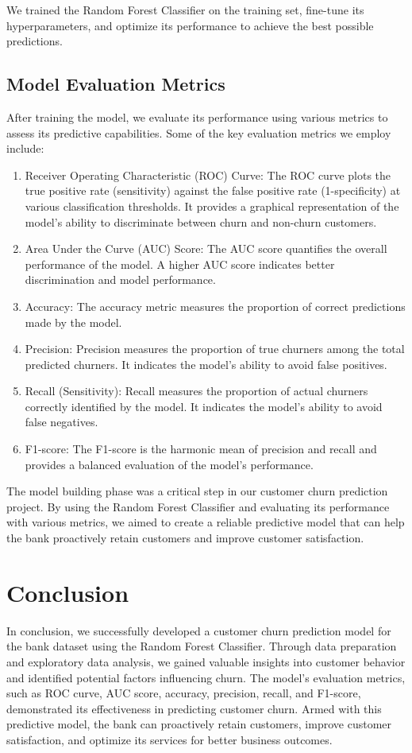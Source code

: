 \documentclass[11pt,a4paper]{article}
\begin{document}
We trained the Random Forest Classifier on the training set, fine-tune its hyperparameters, and optimize its performance to achieve the best possible predictions.

\subsection{Model Evaluation Metrics}

After training the model, we evaluate its performance using various metrics to assess its predictive capabilities. Some of the key evaluation metrics we employ include: 

\begin{enumerate}
    \item Receiver Operating Characteristic (ROC) Curve: The ROC curve plots the true positive rate (sensitivity) against the false positive rate (1-specificity) at various classification thresholds. It provides a graphical representation of the model's ability to discriminate between churn and non-churn customers.
    \item Area Under the Curve (AUC) Score: The AUC score quantifies the overall performance of the model. A higher AUC score indicates better discrimination and model performance.
    \item Accuracy: The accuracy metric measures the proportion of correct predictions made by the model.
    \item Precision: Precision measures the proportion of true churners among the total predicted churners. It indicates the model's ability to avoid false positives.
    \item Recall (Sensitivity): Recall measures the proportion of actual churners correctly identified by the model. It indicates the model's ability to avoid false negatives.
    \item F1-score: The F1-score is the harmonic mean of precision and recall and provides a balanced evaluation of the model's performance.
\end{enumerate}

The model building phase was a critical step in our customer churn prediction project. By using the Random Forest Classifier and evaluating its performance with various metrics, we aimed to create a reliable predictive model that can help the bank proactively retain customers and improve customer satisfaction.


\section{Conclusion}

In conclusion, we successfully developed a customer churn prediction model for the bank dataset using the Random Forest Classifier. Through data preparation and exploratory data analysis, we gained valuable insights into customer behavior and identified potential factors influencing churn. The model's evaluation metrics, such as ROC curve, AUC score, accuracy, precision, recall, and F1-score, demonstrated its effectiveness in predicting customer churn. Armed with this predictive model, the bank can proactively retain customers, improve customer satisfaction, and optimize its services for better business outcomes.
\end{document}
